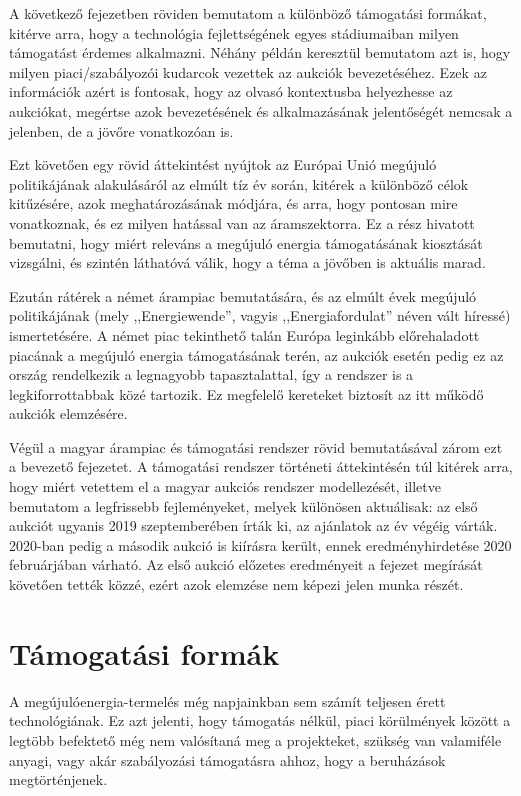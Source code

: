 \documentclass[twoside, magyar, showtrims]{corvinusphd}
\begin{document}
A következő fejezetben röviden bemutatom a különböző
támogatási formákat, kitérve arra, hogy a technológia fejlettségének
egyes stádiumaiban milyen támogatást érdemes alkalmazni. 
Néhány példán keresztül bemutatom azt is, hogy milyen
piaci/szabályozói kudarcok vezettek az aukciók bevezetéséhez.
Ezek az információk azért is fontosak, 
hogy az olvasó kontextusba helyezhesse az aukciókat,
megértse azok bevezetésének és alkalmazásának
jelentőségét nemcsak a jelenben, de 
a jövőre vonatkozóan is.

Ezt követően egy rövid áttekintést nyújtok az Európai Unió
megújuló politikájának alakulásáról az elmúlt tíz év során, kitérek
a különböző célok kitűzésére, azok meghatározásának módjára, 
és arra, hogy pontosan mire vonatkoznak, és ez milyen hatással
van az áramszektorra. Ez a rész hivatott bemutatni,
hogy miért releváns a megújuló energia támogatásának kiosztását
vizsgálni, és szintén láthatóvá válik, hogy a téma a jövőben is
aktuális marad.

Ezután rátérek a német árampiac bemutatására, és az elmúlt évek
megújuló politikájának (mely ,,Energiewende'', vagyis ,,Energiafordulat''
néven vált híressé) ismertetésére. A német piac tekinthető talán
Európa leginkább előrehaladott piacának a megújuló energia
támogatásának terén, az aukciók esetén pedig ez az ország
rendelkezik a legnagyobb tapasztalattal, így a rendszer is a legkiforrottabbak
közé tartozik. Ez megfelelő kereteket biztosít az itt működő
aukciók elemzésére.

Végül a magyar árampiac és támogatási rendszer rövid bemutatásával
zárom ezt a bevezető fejezetet. A támogatási rendszer történeti
áttekintésén túl kitérek arra, hogy miért vetettem el a magyar
aukciós rendszer modellezését, illetve bemutatom a legfrissebb
fejleményeket, melyek különösen aktuálisak:
az első aukciót ugyanis 2019 szeptemberében írták ki, az ajánlatok
az év végéig várták. 2020-ban pedig a második aukció is
kiírásra került, ennek eredményhirdetése 2020 februárjában várható.
Az első aukció előzetes eredményeit
a fejezet megírását követően tették közzé,
ezért azok elemzése nem képezi jelen munka részét.

\section{Támogatási formák}

A megújulóenergia-termelés még napjainkban sem számít 
teljesen érett technológiának. Ez azt jelenti, hogy támogatás 
nélkül, piaci körülmények között a legtöbb befektető még
nem valósítaná meg a projekteket, szükség van valamiféle
anyagi, vagy akár szabályozási támogatásra ahhoz, hogy
a beruházások megtörténjenek.
\end{document}
